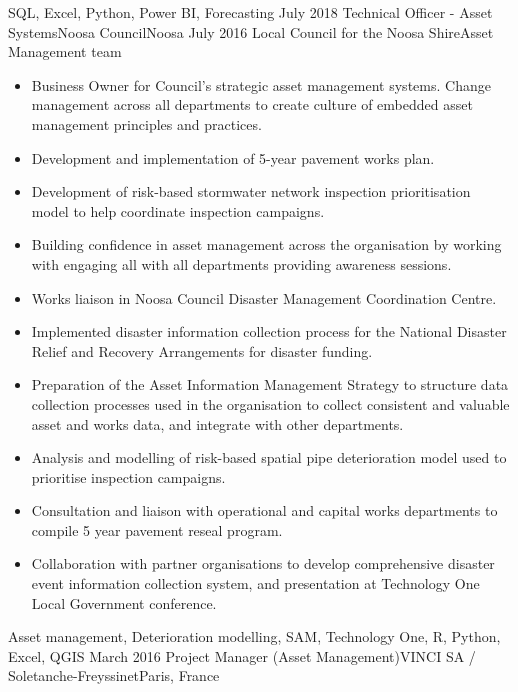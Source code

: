 \begin{experiences}
{\begin{itemize}
                      \end{itemize}
                    }
                    {SQL, Excel, Python, Power BI, Forecasting}
  \emptySeparator
  \consultantexperience
    {July 2018} {Technical Officer - Asset Systems}{Noosa Council}{Noosa}
    {July 2016}   {Local Council for the Noosa Shire}{Asset Management team}
      {
                      \begin{itemize}
                        \item Business Owner for Council's strategic asset management systems. Change management across all departments to create culture of embedded asset management principles and practices.
		\item Development and implementation of 5-year pavement works plan.
		\item Development of risk-based stormwater network inspection prioritisation model to help coordinate inspection campaigns.
		\item Building confidence in asset management across the organisation by working with engaging all with all departments providing awareness sessions.
		\item Works liaison in Noosa Council Disaster Management Coordination Centre.
		\item Implemented disaster information collection process for the National Disaster Relief and Recovery Arrangements for disaster funding.
		\item Preparation of the Asset Information Management Strategy to structure data collection processes used in the organisation to collect consistent and valuable asset and works data, and integrate with other departments.
		\item Analysis and modelling of risk-based spatial pipe deterioration model used to prioritise inspection campaigns.
		\item Consultation and liaison with operational and capital works departments to compile 5 year pavement reseal program.
		\item Collaboration with partner organisations to develop comprehensive disaster event information collection system, and presentation at Technology One Local Government conference.                                                      
                      \end{itemize}
                    }
                    {Asset management, Deterioration modelling, SAM, Technology One, R, Python, Excel, QGIS}
  \emptySeparator
  \consultantexperience
    {March 2016}     {Project Manager (Asset Management)}{VINCI SA / Soletanche-Freyssinet}{Paris, France}

\end{experiences}
